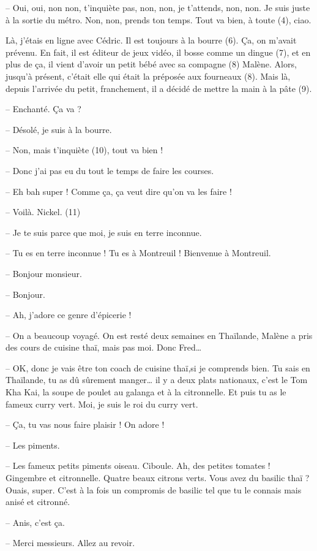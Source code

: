 \documentclass[11pt, french]{report}
\begin{document}
-- Oui, oui, non non, t’inquiète pas, non, non, je t’attends, non, non. Je suis
juste à la sortie du métro. Non, non, prends ton temps. Tout va bien,
à toute (4), ciao.

Là, j’étais en ligne avec Cédric. Il est toujours à la bourre (6). Ça, on
m’avait prévenu. En fait, il est éditeur de jeux vidéo, il bosse comme un
dingue (7), et en plus de ça, il vient d’avoir un petit bébé avec sa
compagne (8) Malène. Alors, jusqu’à présent, c’était elle qui était la préposée
aux fourneaux (8). Mais là, depuis l’arrivée du petit, franchement, il a décidé
de mettre la main à la pâte (9).

-- Enchanté. Ça va ?

-- Désolé, je suis à la bourre.

-- Non, mais t’inquiète (10), tout va bien !

-- Donc j’ai pas eu du tout le temps de faire les courses.

-- Eh bah super ! Comme ça, ça veut dire qu’on va les faire !

-- Voilà. Nickel. (11)

-- Je te suis parce que moi, je suis en terre inconnue.

-- Tu es en terre inconnue ! Tu es à Montreuil ! Bienvenue à Montreuil.

-- Bonjour monsieur.

-- Bonjour.

-- Ah, j’adore ce genre d’épicerie !

-- On a beaucoup voyagé. On est resté deux semaines en Thaïlande, Malène a
pris des cours de cuisine thaï, mais pas moi. Donc Fred…

-- OK, donc je vais être ton coach de cuisine thaï,si je comprends bien. Tu sais
en Thaïlande, tu as dû sûrement manger… il y a deux plats nationaux, c’est le
Tom Kha Kai, la soupe de poulet au galanga et à la citronnelle. Et puis tu as le
fameux curry vert. Moi, je suis le roi du curry vert.

-- Ça, tu vas nous faire plaisir ! On adore !

-- Les piments.

-- Les fameux petits piments oiseau. Ciboule. Ah, des petites tomates ! Gingembre
et citronnelle. Quatre beaux citrons verts. Vous avez du basilic thaï ? Ouais,
super. C’est à la fois un compromis de basilic tel que tu le connais mais anisé
et citronné.

-- Anis, c’est ça.

-- Merci messieurs. Allez au revoir.
\end{document}

